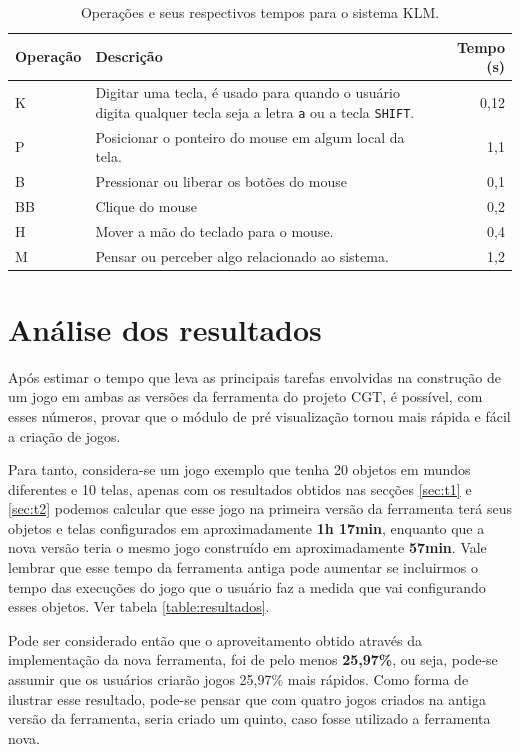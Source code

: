 \documentclass[12pt,oneside,openright,a4paper,english,brazil,sumario=tradicional]{abntex2}
\begin{document}
\begin{table}[p]
   \centering
   \begin{tabular}{| l | p{18em} | r |}
      \hline
      \textbf{Operação} & \textbf{Descrição} & \textbf{Tempo (s)} \\
      \hline
      K & Digitar uma tecla, é usado para quando o usuário digita qualquer tecla seja a letra \texttt{a} ou a tecla \texttt{SHIFT}.  & 0,12 \\
      P & Posicionar o ponteiro do mouse em algum local da tela.  & 1,1  \\
      B & Pressionar ou liberar os botões do mouse & 0,1 \\
      BB & Clique do mouse & 0,2 \\
      H & Mover a mão do teclado para o mouse. & 0,4 \\
      M & Pensar ou perceber algo relacionado ao sistema. & 1,2 \\
      \hline
   \end{tabular}
   \caption{Operações e seus respectivos tempos para o sistema KLM.}
   \label{table:klm-ops}
\end{table}

\section{Análise dos resultados}
Após estimar o tempo que leva as principais tarefas envolvidas na construção de um jogo em ambas as versões da ferramenta do projeto CGT, é possível, com esses números, provar que o módulo de pré visualização tornou mais rápida e fácil a criação de jogos.

Para tanto, considera-se um jogo exemplo que tenha 20 objetos em mundos diferentes e 10 telas, apenas com os resultados obtidos nas secções \ref{sec:t1}  e \ref{sec:t2} podemos calcular que esse jogo na primeira versão da ferramenta terá seus objetos e telas configurados em aproximadamente \textbf{1h 17min}, enquanto que a nova versão teria o mesmo jogo construído em aproximadamente \textbf{57min}. Vale lembrar que esse tempo da ferramenta antiga pode aumentar se incluirmos o tempo das execuções do jogo que o usuário faz a medida que vai configurando esses objetos. Ver tabela \ref{table:resultados}.

Pode ser considerado então que o aproveitamento obtido através da implementação da nova ferramenta, foi de pelo menos \textbf{25,97\%}, ou seja, pode-se assumir que os usuários criarão jogos 25,97\% mais rápidos. Como forma de ilustrar esse resultado, pode-se pensar que com quatro jogos criados na antiga versão da ferramenta, seria criado um quinto, caso fosse utilizado a ferramenta nova.
\end{document}
